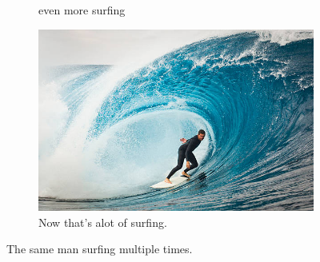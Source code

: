 \documentclass{article}
\begin{document}
\begin{figure}[h!]
\begin{subfigure}[b]{0.3\linewidth}
			\caption{even more surfing}
		\end{subfigure}
		\begin{subfigure}[b]{0.5\linewidth}
			\includegraphics[width=\linewidth]{surf.jpg}
			\caption{Now that's alot of surfing.}
		\end{subfigure}
		\caption{The same man surfing multiple times.}
		\label{fig:surf}
	\end{figure}
\end{document}
